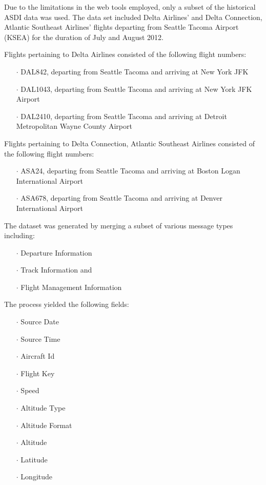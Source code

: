 \documentclass{sig-alternate}
\begin{document}
Due to the limitations in the web tools employed, only a
subset of the historical ASDI data was used. The data
set included Delta Airlines' and Delta Connection, Atlantic
Southeast Airlines’ flights departing from Seattle
Tacoma Airport (KSEA) for the duration of July
and August 2012.

Flights pertaining to Delta Airlines consisted
of the following flight numbers:
\begin{itemize}
\item[$\cdot$] DAL842, departing from Seattle Tacoma
and arriving at New York JFK
\item[$\cdot$]  DAL1043, departing from Seattle Tacoma
and arriving at New York JFK Airport
\item[$\cdot$]  DAL2410, departing from Seattle Tacoma
and arriving at Detroit Metropolitan
Wayne  County Airport
\end{itemize}

Flights pertaining to Delta Connection,
Atlantic Southeast Airlines consisted of the
following flight numbers:
\begin{itemize}
\item[$\cdot$] ASA24, departing from Seattle Tacoma
and arriving at Boston Logan International
Airport
\item[$\cdot$]  ASA678, departing from Seattle Tacoma
and arriving at Denver International
Airport
\end{itemize}

The dataset was generated by merging a subset of
various message types including:
\begin{itemize}
\item[$\cdot$] Departure Information
\item[$\cdot$] Track Information and
\item[$\cdot$]  Flight Management Information
\end{itemize}

The process yielded the following fields:
\begin{itemize}
\item[$\cdot$] Source Date
\item[$\cdot$] Source Time
\item[$\cdot$] Aircraft Id
\item[$\cdot$] Flight Key
\item[$\cdot$] Speed
\item[$\cdot$] Altitude Type
\item[$\cdot$] Altitude Format
\item[$\cdot$] Altitude
\item[$\cdot$] Latitude
\item[$\cdot$] Longitude
\end{itemize}
\end{document}
